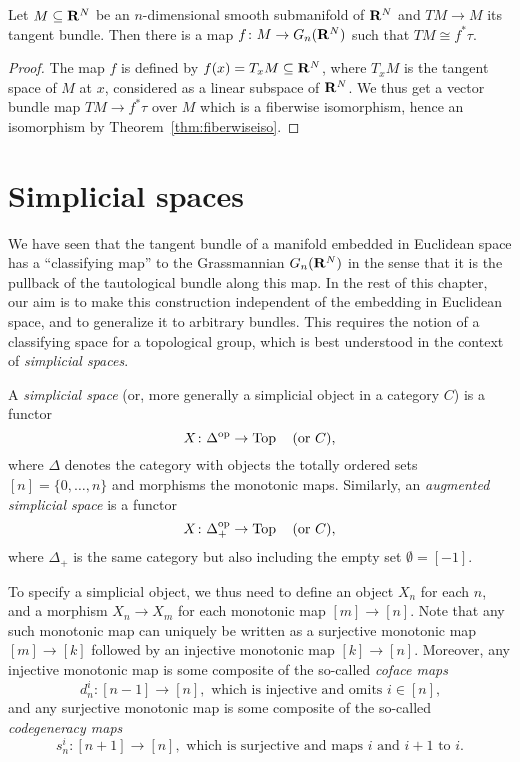 \documentclass[a4paper,openany]{scrbook}
\begin{document}
\begin{thm}
Let $M \subseteq \mathbf R^N$ be an $n$-dimensional smooth submanifold of $\mathbf R^N$ and $TM \to M$ its tangent bundle. Then there is a map $f\colon M \to G_n(\mathbf R^N)$ such that $TM \cong f^*\tau$.
\end{thm}
\begin{proof}
The map $f$ is defined by $f(x) = T_xM \subseteq \mathbf R^N$, where $T_xM$ is the tangent space of $M$ at $x$, considered as a linear subspace of $\mathbf R^N$. We thus get a vector bundle map $TM \to f^*\tau$ over $M$ which is a fiberwise isomorphism, hence an isomorphism by Theorem~\ref{thm:fiberwiseiso}.
\end{proof}

\section{Simplicial spaces}\label{sec:simplicial-spaces}

We have seen that the tangent bundle of a manifold embedded in Euclidean space has a “classifying map” to the Grassmannian $G_n(\mathbf R^N)$ in the sense that it is the pullback of the tautological bundle along this map. In the rest of this chapter, our aim is to make this construction independent of the embedding in Euclidean space, and to generalize it to arbitrary bundles. This requires the notion of a classifying space for a topological group, which is best understood in the context of \emph{simplicial spaces}.

\begin{defn}
A \emph{simplicial space} (or, more generally a simplicial object in a category $C$) is a functor
\[
X\colon \Delta^{\operatorname{op}} \to \operatorname{Top} \quad \text{(or $C$)},
\]
where $\Delta$ denotes the category with objects the totally ordered sets $[n] = \{0,\dots,n\}$ and morphisms the monotonic maps. Similarly, an \emph{augmented simplicial space} is a functor
\[
X\colon \Delta^{\operatorname{op}}_+ \to \operatorname{Top} \quad \text{(or $C$)},
\]
where $\Delta_+$ is the same category but also including the empty set $\emptyset = [-1]$.
\end{defn}

To specify a simplicial object, we thus need to define an object $X_n$ for each $n$, and a morphism $X_n \to X_m$ for each monotonic map $[m] \to [n]$. Note that any such monotonic map can uniquely be written as a surjective monotonic map $[m] \to [k]$ followed by an injective monotonic map $[k] \to [n]$. Moreover, any injective monotonic map is some composite of the so-called \emph{coface maps}
\[
d^i_n\colon [n-1] \to [n], \text{ which is injective and omits $i \in [n]$,}
\]
and any surjective monotonic map is some composite of the so-called \emph{codegeneracy maps}
\[
s^i_n\colon [n+1] \to [n], \text{ which is surjective and maps $i$ and $i+1$ to $i$.}
\]
\end{document}
